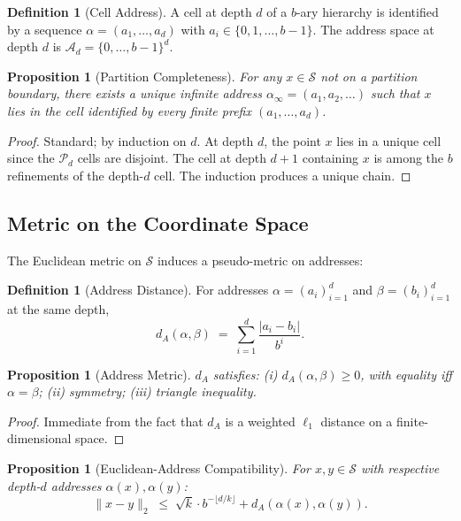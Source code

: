 \documentclass[11pt,a4paper]{article}
\newtheorem{proposition}[theorem]{Proposition}
\theoremstyle{definition}
\newtheorem{definition}[theorem]{Definition}
\theoremstyle{remark}
\newcommand{\Sc}{\mathcal{S}}
\begin{document}
\begin{definition}[Cell Address]
A cell at depth $d$ of a $b$-ary hierarchy is identified by a sequence $\alpha = (a_1, \ldots, a_d)$ with $a_i \in \{0, 1, \ldots, b-1\}$. The address space at depth $d$ is $\mathcal{A}_d = \{0,\ldots,b-1\}^d$.
\end{definition}

\begin{proposition}[Partition Completeness]
\label{prop:completeness}
For any $x \in \Sc$ not on a partition boundary, there exists a unique infinite address $\alpha_\infty = (a_1, a_2, \ldots)$ such that $x$ lies in the cell identified by every finite prefix $(a_1, \ldots, a_d)$.
\end{proposition}

\begin{proof}
Standard; by induction on $d$. At depth $d$, the point $x$ lies in a unique cell since the $\mathcal{P}_d$ cells are disjoint. The cell at depth $d+1$ containing $x$ is among the $b$ refinements of the depth-$d$ cell. The induction produces a unique chain.
\end{proof}

\subsection{Metric on the Coordinate Space}

The Euclidean metric on $\Sc$ induces a pseudo-metric on addresses:

\begin{definition}[Address Distance]
\label{def:address-dist}
For addresses $\alpha = (a_i)_{i=1}^d$ and $\beta = (b_i)_{i=1}^d$ at the same depth,
\[
d_A(\alpha, \beta) \;=\; \sum_{i=1}^{d} \frac{|a_i - b_i|}{b^i}.
\]
\end{definition}

\begin{proposition}[Address Metric]
\label{prop:metric}
$d_A$ satisfies: (i) $d_A(\alpha, \beta) \geq 0$, with equality iff $\alpha = \beta$; (ii) symmetry; (iii) triangle inequality.
\end{proposition}

\begin{proof}
Immediate from the fact that $d_A$ is a weighted $\ell_1$ distance on a finite-dimensional space.
\end{proof}

\begin{proposition}[Euclidean-Address Compatibility]
\label{prop:compat}
For $x, y \in \Sc$ with respective depth-$d$ addresses $\alpha(x), \alpha(y)$:
\[
\|x - y\|_2 \;\leq\; \sqrt{k} \cdot b^{-\lfloor d/k \rfloor} + d_A(\alpha(x), \alpha(y)).
\]
\end{proposition}
\end{document}
